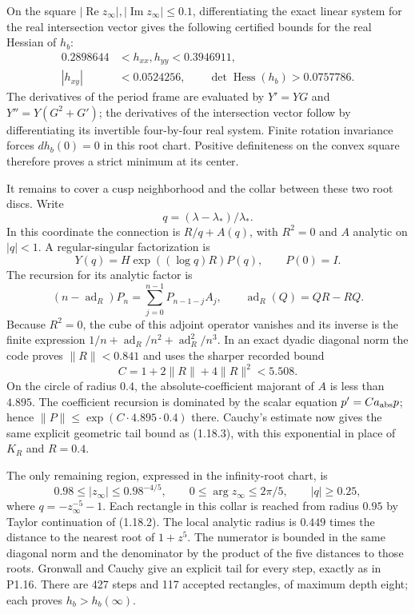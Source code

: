 \item On the square $|\operatorname{Re}z_\infty|,
|\operatorname{Im}z_\infty|\leq0.1$, differentiating the exact linear
system for the real intersection vector gives the following
certified bounds for the real Hessian of $h_b$:
\[
\begin{split}
 0.2898644&<h_{xx},h_{yy}<0.3946911,\\
 |h_{xy}|&<0.0524256,\qquad
 \det\operatorname{Hess}(h_b)>0.0757786.
\end{split}
\tag{1.18.5}
\]
The derivatives of the period frame are evaluated by
$Y'=YG$ and $Y''=Y(G^2+G')$; the derivatives of the intersection
vector follow by differentiating its invertible four-by-four real
system.  Finite rotation invariance forces $dh_b(0)=0$ in this
root chart.  Positive definiteness on the convex square therefore
proves a strict minimum at its center.


\item It remains to cover a cusp neighborhood and the collar between these
two root discs.  Write
\[
 q=(\lambda-\lambda_*)/\lambda_*.
\]
In this coordinate the connection is $R/q+A(q)$, with $R^2=0$
and $A$ analytic on $|q|<1$.  A regular-singular factorization is
\[
 Y(q)=H\exp((\log q)R)P(q),\qquad P(0)=I.
\]
The recursion for its analytic factor is
\[
 (n-\operatorname{ad}_R)P_n
   =\sum_{j=0}^{n-1}P_{n-1-j}A_j,
 \qquad \operatorname{ad}_R(Q)=QR-RQ.
\]
Because $R^2=0$, the cube of this adjoint operator vanishes and its
inverse is the finite expression
$1/n+\operatorname{ad}_R/n^2+\operatorname{ad}_R^2/n^3$.
In an exact dyadic diagonal norm the code proves
$\|R\|<0.841$ and uses the sharper recorded bound
\[
 C=1+2\|R\|+4\|R\|^2<5.508.
\]
On the circle of radius $0.4$, the absolute-coefficient majorant of
$A$ is less than $4.895$.  The coefficient recursion is dominated
by the scalar equation $p'=Ca_{\rm abs}p$; hence
$\|P\|\leq\exp(C\cdot4.895\cdot0.4)$ there.  Cauchy's estimate
now gives the same explicit geometric tail bound as (1.18.3), with
this exponential in place of $K_R$ and $R=0.4$.


\item The only remaining region, expressed in the infinity-root chart, is
\[
 0.98\leq |z_\infty|\leq0.98^{-4/5},\qquad
 0\leq\arg z_\infty\leq2\pi/5,
 \qquad |q|\geq0.25,
\]
where $q=-z_\infty^{-5}-1$.
Each rectangle in this collar is reached from radius $0.95$ by
Taylor continuation of (1.18.2).  The local analytic radius is
$0.449$ times the distance to the nearest root of $1+z^5$.
The numerator is bounded in the same diagonal norm and the
denominator by the product of the five distances to those roots.
Gronwall and Cauchy give an explicit tail for every step, exactly
as in P1.16.  There are 427 steps and 117 accepted rectangles,
of maximum depth eight; each proves $h_b>h_b(\infty)$.

